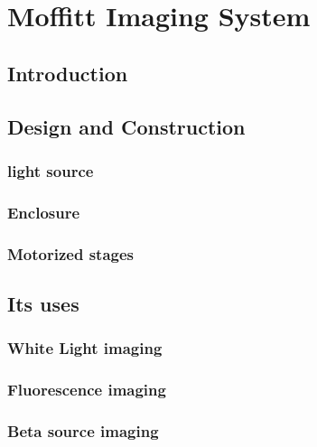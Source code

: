 \chapter{Moffitt Imaging System}\label{app:moffitt}
\section{Introduction}
\section{Design and Construction}
	\subsection{light source}
	\subsection{Enclosure}
	\subsection{Motorized stages}
\section{Its uses}
	\subsection{White Light imaging}
	\subsection{Fluorescence imaging}
	\subsection{Beta source imaging}